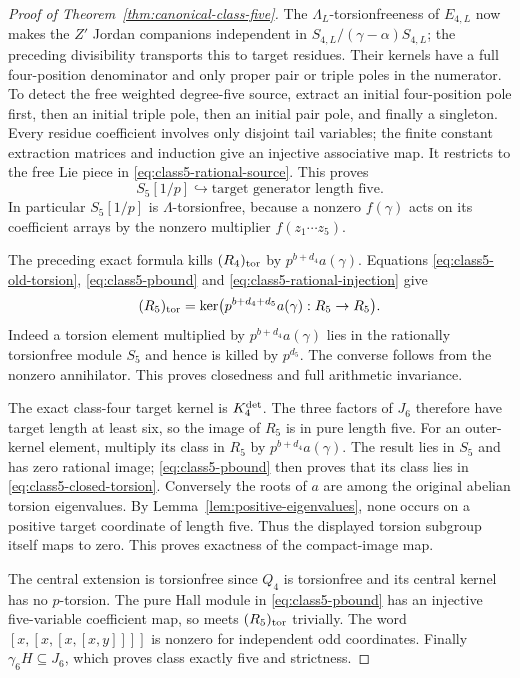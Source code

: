 \documentclass[11pt]{article}
\theoremstyle{definition}\newtheorem{definition}[theorem]{Definition}
\begin{document}
\begin{proof}[Proof of Theorem~\ref{thm:canonical-class-five}]
The $\Lambda_L$-torsionfreeness of $E_{4,L}$ now makes
the $Z'$ Jordan companions independent in
$S_{4,L}/(\gamma-\alpha)S_{4,L}$; the preceding
divisibility transports this to target
residues. Their kernels have a full four-position
denominator and only proper pair or triple poles
in the numerator. To detect the free weighted
degree-five source, extract an initial four-position
pole first, then an initial triple pole, then an
initial pair pole, and finally a singleton. Every
residue coefficient involves only disjoint tail
variables; the finite constant extraction matrices
and induction give an injective associative map.
It restricts to the free Lie piece in
\eqref{eq:class5-rational-source}. This proves
\begin{equation}\label{eq:class5-rational-injection}
 S_5[1/p]\hookrightarrow\text{target generator length five}.
\end{equation}
In particular $S_5[1/p]$ is $\Lambda$-torsionfree,
because a nonzero $f(\gamma)$ acts on its coefficient
arrays by the nonzero multiplier $f(z_1\cdots z_5)$.

The preceding exact formula kills $(R_4)_{\rm tor}$
by $p^{b+d_4}a(\gamma)$. Equations
\eqref{eq:class5-old-torsion},
\eqref{eq:class5-pbound} and
\eqref{eq:class5-rational-injection} give
\begin{equation}\label{eq:class5-closed-torsion}
 (R_5)_{\rm tor}
      =\ker\bigl(p^{b+d_4+d_5}a(\gamma):R_5\to R_5\bigr).
\end{equation}
Indeed a torsion element multiplied by
$p^{b+d_4}a(\gamma)$ lies in the rationally torsionfree
module $S_5$ and hence is killed by $p^{d_5}$.
The converse follows from the nonzero annihilator.
This proves closedness and full arithmetic invariance.

The exact class-four target kernel is $K_4^{\rm det}$.
The three factors of $J_6$ therefore have target
length at least six, so the image of $R_5$ is in pure
length five. For an outer-kernel element,
multiply its class in $R_5$ by $p^{b+d_4}a(\gamma)$.
The result lies in $S_5$ and has zero rational image;
\eqref{eq:class5-pbound} then proves that its class
lies in \eqref{eq:class5-closed-torsion}.
Conversely the roots of $a$ are among the original
abelian torsion eigenvalues. By
Lemma~\ref{lem:positive-eigenvalues}, none occurs on
a positive target coordinate of length five.
Thus the displayed torsion subgroup itself maps to
zero. This proves exactness of the compact-image map.

The central extension is torsionfree since $Q_4$ is
torsionfree and its central kernel has no $p$-torsion.
The pure Hall module in \eqref{eq:class5-pbound}
has an injective five-variable coefficient map,
so meets $(R_5)_{\rm tor}$ trivially. The word
$[x,[x,[x,[x,y]]]]$ is nonzero for independent odd
coordinates. Finally $\gamma_6H\subseteq J_6$,
which proves class exactly five and strictness.
\end{proof}
\end{document}
